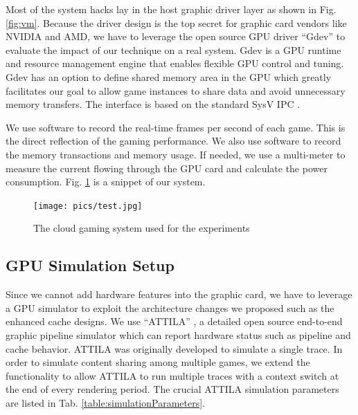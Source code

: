 \documentclass[pageno]{jpaper}
\begin{document}
Most of the system hacks lay in the host graphic driver layer as shown in Fig. \ref{fig:vm}. Because the driver design is the top secret for graphic card vendors like NVIDIA and AMD, we have to leverage the open source GPU driver ``Gdev'' \cite{gdevpaper} to evaluate the impact of our technique on a real system. Gdev is a GPU runtime and resource management engine that enables flexible GPU control and tuning. Gdev has an option to define shared memory area in the GPU which greatly facilitates our goal to allow game instances to share data and avoid unnecessary memory transfers. The interface is based on the standard SysV IPC \cite{gdevpaper}.

We use software to record the real-time frames per second of each game. This is the direct reflection of the gaming performance. We also use software to record the memory transactions and memory usage. If needed, we use a multi-meter to measure the current flowing through the GPU card and calculate the power consumption. Fig. \ref{fig:test} is a snippet of our system.

 \begin{figure}
\centering
\texttt{[image: pics/test.jpg]}
\caption{The cloud gaming system used for the experiments}
\label{fig:test}
\end{figure}

\subsection{GPU Simulation Setup}

Since we cannot add hardware features into the graphic card, we have to leverage a GPU simulator to exploit the architecture changes we proposed such as the enhanced cache designs. We use ``ATTILA'' \cite{attilapaper}, a detailed open source end-to-end graphic pipeline simulator which can report hardware status such as pipeline and cache behavior. ATTILA was originally developed to simulate a single trace. In order to simulate
content sharing among multiple games, we extend the functionality to
allow ATTILA to run multiple traces with a context switch at the end of every rendering period. The crucial ATTILA simulation parameters are listed in Tab. \ref{table:simulationParameters}.
\end{document}
